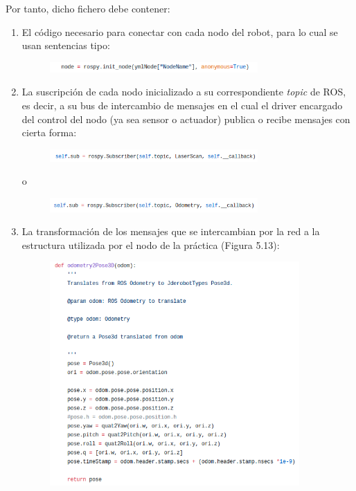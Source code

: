 Por tanto, dicho fichero debe contener:
\begin{enumerate}
	\item El código necesario para conectar con cada nodo del robot, para lo cual se usan sentencias tipo:
	\begin{figure}[H]
	\begin{center}
		\includegraphics[width=0.75\textwidth]{figures/initnode.png}
		\label{fig.initnode}
		\end{center}
	\end{figure}
	\item La suscripción de cada nodo inicializado a su correspondiente \textit{topic} de ROS, es decir, a su bus de intercambio de mensajes en el cual el driver encargado del control del nodo (ya sea sensor o actuador) publica o recibe mensajes con cierta forma:
	\begin{figure}[H]
	\begin{center}
		\includegraphics[width=0.75\textwidth]{figures/subscriberlaser.png}
		\label{fig.subscriberlaser}
		\end{center}
	\end{figure}
	\hspace{0.48\linewidth}o
	\begin{figure}[H]
	\begin{center}
		\includegraphics[width=0.75\textwidth]{figures/subscriberodometry.png}
		\label{fig.subscriberodometry}
		\end{center}
	\end{figure}
	\item La transformación de los mensajes que se intercambian por la red a la estructura utilizada por el nodo de la práctica (Figura 5.13):
	\begin{figure}[H]
	\begin{center}
		\includegraphics[width=0.90\textwidth]{figures/odom2pose.png}

\end{center}
\end{figure}
\end{enumerate}
